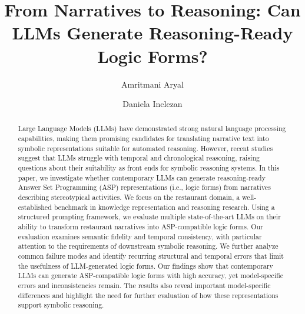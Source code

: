 \documentclass[runningheads]{llncs}
\begin{document}
%
\title{From Narratives to Reasoning: Can LLMs Generate Reasoning-Ready Logic Forms?}
%
%
\author{Amritmani Aryal \and 
Daniela Inclezan
}
%
%
%
\maketitle              %
%
\begin{abstract}
Large Language Models (LLMs) have demonstrated strong natural language processing capabilities, making them promising candidates for translating narrative text into symbolic representations suitable for automated reasoning. However, recent studies suggest that LLMs struggle with temporal and chronological reasoning, raising questions about their suitability as front ends for symbolic reasoning systems. In this paper, we investigate whether contemporary LLMs can generate reasoning-ready Answer Set Programming (ASP) representations (i.e., logic forms) from narratives describing stereotypical activities.
We focus on the restaurant domain, a well-established benchmark in knowledge representation and reasoning research. Using a structured prompting framework, we evaluate multiple state-of-the-art LLMs on their ability to transform restaurant narratives into ASP-compatible logic forms. Our evaluation examines semantic fidelity and temporal consistency, with particular attention to the requirements of downstream symbolic reasoning. We further analyze common failure modes and identify recurring structural and temporal errors that limit the usefulness of LLM-generated logic forms.
Our findings show that contemporary LLMs can generate ASP-compatible logic forms with high accuracy, yet model-specific errors and inconsistencies remain. The results also reveal important model-specific differences and highlight the need for further evaluation of how these representations support symbolic reasoning.


\end{abstract}
%
%
%
\end{document}
